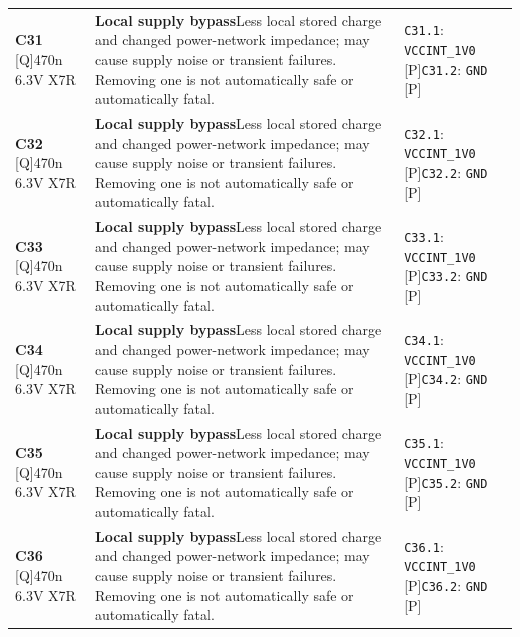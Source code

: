 \documentclass[11pt,a4paper]{article}
\begin{document}
\begin{longtable}{@{}P{27mm}P{77mm}P{62mm}@{}}
\textbf{C31} [Q]\newline 470n 6.3V X7R & \textbf{Local supply bypass}\newline Less local stored charge and changed power-network impedance; may cause supply noise or transient failures. Removing one is not automatically safe or automatically fatal. & \nolinkurl{C31.1}: \nolinkurl{VCCINT_1V0} [P]\newline \nolinkurl{C31.2}: \nolinkurl{GND} [P] \\
\textbf{C32} [Q]\newline 470n 6.3V X7R & \textbf{Local supply bypass}\newline Less local stored charge and changed power-network impedance; may cause supply noise or transient failures. Removing one is not automatically safe or automatically fatal. & \nolinkurl{C32.1}: \nolinkurl{VCCINT_1V0} [P]\newline \nolinkurl{C32.2}: \nolinkurl{GND} [P] \\
\textbf{C33} [Q]\newline 470n 6.3V X7R & \textbf{Local supply bypass}\newline Less local stored charge and changed power-network impedance; may cause supply noise or transient failures. Removing one is not automatically safe or automatically fatal. & \nolinkurl{C33.1}: \nolinkurl{VCCINT_1V0} [P]\newline \nolinkurl{C33.2}: \nolinkurl{GND} [P] \\
\textbf{C34} [Q]\newline 470n 6.3V X7R & \textbf{Local supply bypass}\newline Less local stored charge and changed power-network impedance; may cause supply noise or transient failures. Removing one is not automatically safe or automatically fatal. & \nolinkurl{C34.1}: \nolinkurl{VCCINT_1V0} [P]\newline \nolinkurl{C34.2}: \nolinkurl{GND} [P] \\
\textbf{C35} [Q]\newline 470n 6.3V X7R & \textbf{Local supply bypass}\newline Less local stored charge and changed power-network impedance; may cause supply noise or transient failures. Removing one is not automatically safe or automatically fatal. & \nolinkurl{C35.1}: \nolinkurl{VCCINT_1V0} [P]\newline \nolinkurl{C35.2}: \nolinkurl{GND} [P] \\
\textbf{C36} [Q]\newline 470n 6.3V X7R & \textbf{Local supply bypass}\newline Less local stored charge and changed power-network impedance; may cause supply noise or transient failures. Removing one is not automatically safe or automatically fatal. & \nolinkurl{C36.1}: \nolinkurl{VCCINT_1V0} [P]\newline \nolinkurl{C36.2}: \nolinkurl{GND} [P] \\

\end{longtable}
\end{document}
